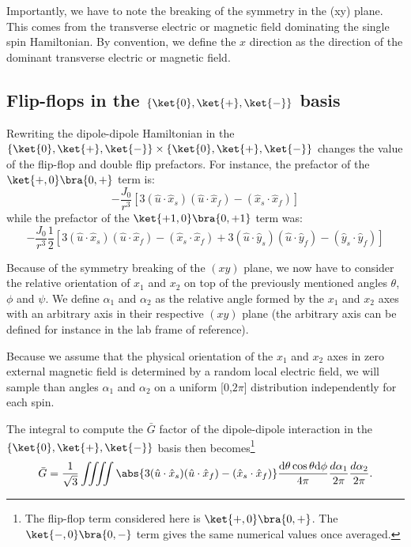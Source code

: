 \documentclass[a4paper, 11pt]{book}
\begin{document}
Importantly, we have to note the breaking of the symmetry in the (xy) plane. This comes from the transverse electric or magnetic field dominating the single spin Hamiltonian. By convention, we define the $x$ direction as the direction of the dominant transverse electric or magnetic field.

\subsection{Flip-flops in the $\{ \ket{0}, \ket{+}, \ket{-}\}$ basis}
\label{sec flip-flop +/-}
Rewriting the dipole-dipole Hamiltonian in the $\{ \ket{0}, \ket{+}, \ket{-}\} \times \{ \ket{0}, \ket{+}, \ket{-}\}$ changes the value of the flip-flop and double flip prefactors. For instance, the prefactor of the $\ket{+,0}\bra{0,+}$ term is: \begin{equation}
-\frac{J_0}{r^3}\left[3(\hat{u}\cdot\hat{x}_s)(\hat{u}\cdot\hat{x}_f) - (\hat{x}_s \cdot \hat{x}_f)\right]
\end{equation}
while the prefactor of the $\ket{+1,0}\bra{0,+1}$ term was: \begin{equation}
-\frac{J_0}{r^3}\frac{1}{2}\left[3(\hat{u}\cdot\hat{x}_s)(\hat{u}\cdot\hat{x}_f) - (\hat{x}_s \cdot \hat{x}_f) + 3(\hat{u}\cdot\hat{y}_s)(\hat{u}\cdot\hat{y}_f) - (\hat{y}_s \cdot \hat{y}_f) \right] 
\end{equation}

Because of the symmetry breaking of the $(xy)$ plane, we now have to consider the relative orientation of $x_1$ and $x_2$ on top of the previously mentioned angles $\theta$, $\phi$ and $\psi$. We define $\alpha_1$ and $\alpha_2$ as the relative angle formed by the $x_1$ and $x_2$ axes with an arbitrary axis in their respective $(xy)$ plane (the arbitrary axis can be defined for instance in the lab frame of reference). 

Because we assume that the physical orientation of the $x_1$ and $x_2$ axes in zero external magnetic field is determined by a random local electric field, we will sample than angles $\alpha_1$ and $\alpha_2$ on a uniform [0,$2\pi$] distribution independently for each spin.

The integral to compute the $\bar G$ factor of the dipole-dipole interaction in the $\{ \ket{0}, \ket{+}, \ket{-}\}$ basis then becomes\footnote{The flip-flop term considered here is $\ket{+,0}\bra{0,+}$. The $\ket{-,0}\bra{0,-}$ term gives the same numerical values once averaged.}
\begin{equation}
\bar G= \frac{1}{\sqrt{3}} \iiiint \abs{3(\hat{u}\cdot\hat{x}_s)(\hat{u}\cdot\hat{x}_f) - (\hat{x}_s \cdot \hat{x}_f)} \frac{\rm d\theta \cos \theta \rm d\phi}{4 \pi} \frac{d \alpha_1}{2\pi} \frac{d \alpha_2}{2\pi}.
\end{equation}
\end{document}
